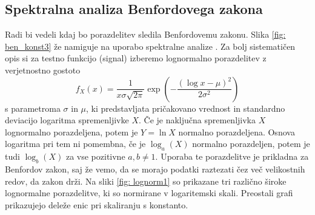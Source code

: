 \documentclass[11pt, oneside]{article}
\theoremstyle{definition}
\begin{document}
\newpage
\subsection{Spektralna analiza Benfordovega zakona}
Radi bi vedeli kdaj bo porazdelitev sledila Benfordovemu zakonu. Slika \ref{fig: ben_konst3} že namiguje na uporabo
spektralne analize \cite{10.5555/281875}. Za bolj sistematičen opis si za testno funkcijo (signal) izberemo lognormalno
porazdelitev z verjetnostno gostoto
\begin{equation}
    \label{eq: lognormal}
    f_X(x) = \frac{1}{x \sigma \sqrt{2\pi}} \exp{\left ( -\frac{(\log x - \mu)^2}{2\sigma^2} \right ) }
\end{equation}
s parametroma $\sigma$ in $\mu$, ki predstavljata pričakovano vrednost in standardno deviacijo logaritma spremenljivke
$X$. Če je naključna spremenljivka $X$ lognormalno porazdeljena, potem je $Y=\ln X$ normalno porazdeljena.
Osnova logaritma pri tem ni pomembna, če je $\log_a(X)$ normalno porazdeljen, potem je tudi $\log_b(X)$ za vse
pozitivne $a, b\neq 1$.
Uporaba te porazdelitve je prikladna za Benfordov zakon, saj že vemo, da se morajo podatki raztezati čez
več velikostnih redov, da zakon drži. Na sliki \ref{fig: lognorm1} so prikazane tri različno široke
lognormalne porazdelitve, ki so normirane v logaritemski skali. Preostali grafi prikazujejo deleže enic pri skaliranju s konstanto.
\end{document}
